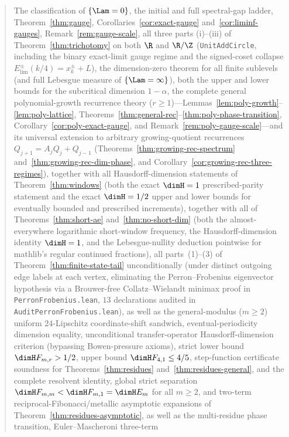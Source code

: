 \begin{abstract}
The classification of $\{\Lam=0\}$, the initial and full spectral-gap ladder,
Theorem~\ref{thm:gauge},
Corollaries~\ref{cor:exact-gauge} and~\ref{cor:liminf-gauges},
Remark~\ref{rem:gauge-scale}, all three parts (i)--(iii) of
Theorem~\ref{thm:trichotomy} on both $\R$ and $\R/\Z$ (\texttt{UnitAddCircle},
including the binary exact-limit gauge regime and the signed-coset collapse
$E_{\mathrm{lim}}^\pm(k/4)=x_k^\pm+L$), the dimension-zero theorem for all
finite sublevels (and full Lebesgue measure of $\{\Lam=\infty\}$), both the upper
and lower bounds for the subcritical dimension $1-\alpha$, the complete
general polynomial-growth recurrence theory ($r\ge1$)---Lemmas~\ref{lem:poly-growth}--\ref{lem:poly-lattice},
Theorems~\ref{thm:general-rec}--\ref{thm:poly-phase-transition},
Corollary~\ref{cor:poly-exact-gauge}, and Remark~\ref{rem:poly-gauge-scale}---and
its universal extension to arbitrary growing-quotient recurrences
$Q_{j+1}=A_jQ_j+Q_{j-1}$ (Theorems~\ref{thm:growing-rec-spectrum}
and~\ref{thm:growing-rec-dim-phase}, and
Corollary~\ref{cor:growing-rec-three-regimes}), together
with all Hausdorff-dimension statements of Theorem~\ref{thm:windows} (both the
exact $\dimH=1$ prescribed-parity statement and the exact $\dimH=1/2$ upper and lower bounds for eventually bounded and prescribed
increments), together with all of Theorems~\ref{thm:short-ae} and~\ref{thm:no-short-dim}
(both the almost-everywhere logarithmic short-window frequency, the
Hausdorff-dimension identity $\dimH=1$, and the Lebesgue-nullity deduction
pointwise for mathlib's regular continued fractions), all parts~(1)--(3) of
Theorem~\ref{thm:finite-state-tail} unconditionally (under distinct outgoing edge
labels at each vertex, eliminating the Perron--Frobenius eigenvector hypothesis via
a Brouwer-free Collatz--Wielandt minimax proof in \texttt{PerronFrobenius.lean}, $13$
declarations audited in \texttt{AuditPerronFrobenius.lean}), as well as the
general-modulus ($m\ge2$) uniform $24$-Lipschitz coordinate-shift sandwich,
eventual-periodicity dimension equality, unconditional transfer-operator
Hausdorff-dimension criterion (bypassing Bowen-pressure axioms), strict lower bound
$\dimH F_{m,r}>1/2$, upper bound $\dimH F_{4,1}\le 4/5$, step-function certificate
soundness for Theorems~\ref{thm:residues} and~\ref{thm:residues-general}, and the
complete resolvent identity, global strict separation
$\dimH F_{m,m}<\dimH F_{m,1}=\dimH E_m$ for all $m\ge2$, and two-term
reciprocal-Fibonacci/metallic asymptotic expansions of Theorem~\ref{thm:residues-asymptotic},
as well as the multi-residue phase transition, Euler--Mascheroni three-term

\end{abstract}
